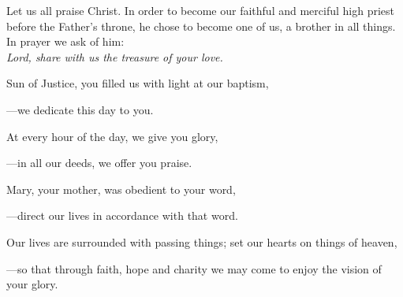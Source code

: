 \intercessions\indent

\begin{hangpar}

Let us all praise Christ. In order to become our faithful and merciful high priest before the Father’s throne, he chose to become one of us, a brother in all things. In prayer we ask of him:\\
\emph{Lord, share with us the treasure of your love.}

\medskip Sun of Justice, you filled us with light at our baptism,

{\color{red}---\thinspace}we dedicate this day to you.

\medskip At every hour of the day, we give you glory,

{\color{red}---\thinspace}in all our deeds, we offer you praise.

\medskip Mary, your mother, was obedient to your word,

{\color{red}---\thinspace}direct our lives in accordance with that word.

\medskip Our lives are surrounded with passing things; set our hearts on things of heaven,

{\color{red}---\thinspace}so that through faith, hope and charity we may come to enjoy the vision of your glory.

\end{hangpar}

